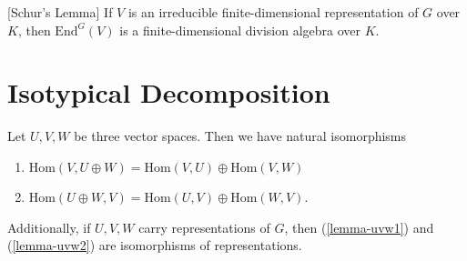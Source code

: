 \begin{thm}\label{schur-lemma}[Schur's Lemma] If $V$ is an irreducible finite-dimensional representation of $G$ over $K$, then $\text{End}^G(V)$ is a finite-dimensional division algebra over $K$.
\end{thm}

\section{Isotypical Decomposition}

\begin{lemma}\label{lemma-uvw}
Let $U, V, W$ be three vector spaces.  Then we have natural isomorphisms
\begin{enumerate}
\item \label{lemma-uvw1} $\text{Hom} (V, U \oplus W) = \text{Hom} (V,U) \oplus \text{Hom} (V,W)$
\item \label{lemma-uvw2} $\text{Hom} (U \oplus W, V) = \text{Hom} (U,V) \oplus \text{Hom} (W,V)$.
\end{enumerate}
Additionally, if $U,V,W$ carry representations of $G$, then (\ref{lemma-uvw1}) and (\ref{lemma-uvw2}) are isomorphisms of representations.
\end{lemma}
